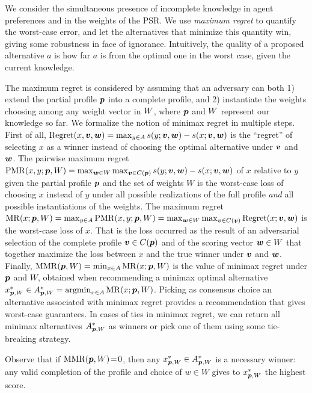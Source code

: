 \documentclass{article}
\begin{document}
We consider the simultaneous presence of incomplete knowledge in agent preferences and in the weights of the PSR.
We use \emph{maximum regret} to quantify the worst-case error, and let the alternatives that minimize this quantity win, giving some robustness in face of ignorance.
Intuitively, the quality of a proposed alternative $a$ is how far $a$ is from the optimal one in the worst case, given the current knowledge.

The maximum regret is considered by assuming that an adversary can both 1) extend the partial profile ${\bm{p}}$ into a complete profile, and 2) instantiate the weights choosing among any weight vector in $W$, where ${\bm{p}}$ and $W$ represent our knowledge so far.
We formalize the notion of minimax regret in multiple steps.
First of all, $\operatorname{Regret}(x, \bm{v}, \bm{w}) = \max_{y \in A} s(y; \bm{v},\bm{w}) - s(x; \bm{v}, \bm{w})$ is the “regret” of selecting $x$ as a winner instead of choosing the optimal alternative under $\bm{v}$ and $\bm{w}$.
The pairwise maximum regret $\operatorname{PMR}(x,y;{\bm{p}},W) = \max_{\bm{w} \in W} \max_{\bm{v} \in C({\bm{p}})} s(y; \bm{v},\bm{w}) - s(x; \bm{v},\bm{w})$ of $x$ relative to $y$ given the partial profile ${\bm{p}}$ and the set of weights $W$
is the worst-case loss of choosing $x$ instead of $y$ under all possible realizations of the full profile {\em and} all possible instantiations of the weights.
The maximum regret $\operatorname{MR}(x;{\bm{p}},W) = \max_{y \in A} \operatorname{PMR}(x,y; {\bm{p}}, W) = \max_{\bm{w} \in W} \max_{\bm{v} \in C(\bm{v})} \operatorname{Regret}(x; \bm{v}, \bm{w})$ is the worst-case loss of $x$. That is the loss occurred as the result of an adversarial selection of the complete profile $\bm{v} \in C({\bm{p}})$ and of the scoring vector $\bm{w} \in W$ that together maximize the loss between $x$ and the true winner under $\bm{v}$ and $\bm{w}$.
Finally,  $\operatorname{MMR}({\bm{p}},W) = \min_{x \in A} \operatorname{MR}(x;{\bm{p}},W)$ is the value of minimax regret under ${\bm{p}}$ and $W$, obtained when recommending a minimax optimal alternative $x^*_{{\bm{p}}, W} \in A^*_{{\bm{p}}, W} = \operatorname*{argmin}_{x \in A} \operatorname{MR}(x;{\bm{p}},W)$.
Picking as consensus choice an alternative associated with minimax regret provides a recommendation that gives worst-case guarantees. 
In cases of ties in minimax regret, we can return all minimax alternatives $A^*_{{\bm{p}}, W}$ as winners or pick one of them using some tie-breaking strategy.

Observe that if $\operatorname{MMR}({\bm{p}}, W)\!=\!0$, then any $x^{*}_{{\bm{p}},W} \in A^*_{{\bm{p}}, W}$ is a necessary winner: any valid completion of the profile and choice of $w \in W$ gives to $x^{*}_{{\bm{p}},W}$ the highest score.
\end{document}
